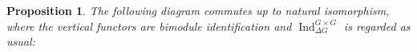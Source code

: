 \documentclass[10pt,letterpaper, boxed, cm]{amsart}
\newcommand{\Ind}{\operatorname{Ind}}
\newtheorem{prop}[theorem]{Proposition}
\theoremstyle{remark}
\theoremstyle{definition}
\begin{document}
	\begin{prop}\label{prop:dualidentification}
		The following diagram commutes up to natural isomorphism, where the vertical functors are bimodule identification and $\Ind_{\Delta G}^{G\times G}$ is regarded as usual:
		\begin{figure}[H]
			\centering
		\end{figure}
	\end{prop}
\end{document}
